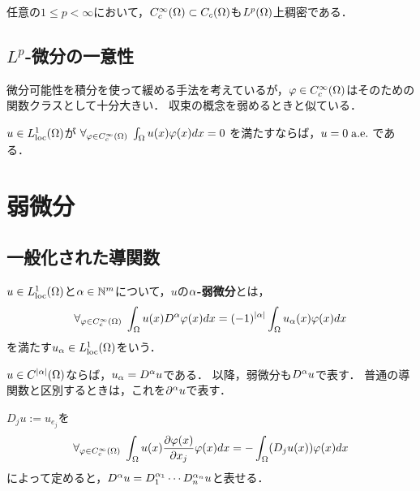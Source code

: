 \documentclass[uplatex,dvipdfmx]{jsreport}
\begin{document}
\begin{theorem}
    任意の$1\le p<\infty$において，$C_c^\infty(\Omega)\subset C_c(\Omega)$も$L^p(\Omega)$上稠密である．
\end{theorem}

\subsection{$L^p$-微分の一意性}

\begin{tcolorbox}[colframe=ForestGreen, colback=ForestGreen!10!white,breakable,colbacktitle=ForestGreen!40!white,coltitle=black,fonttitle=\bfseries\sffamily,
title=]
    微分可能性を積分を使って緩める手法を考えているが，$\varphi\in C_c^\infty(\Omega)$はそのための関数クラスとして十分大きい．
    収束の概念を弱めるときと似ている．
\end{tcolorbox}

\begin{theorem}\label{thm-uniqueness-of-weak-derivative}
    $u\in L^1_{\mathrm{loc}}(\Omega)$が
    $\forall_{\varphi\in C_c^\infty(\Omega)}\;\int_\Omega u(x)\varphi(x)dx=0$
    を満たすならば，$u=0\;\mathrm{a.e.}\;$である．
\end{theorem}

\section{弱微分}

\subsection{一般化された導関数}

\begin{definition}
    $u\in L^1_{\mathrm{loc}}(\Omega)$と$\alpha\in\mathbb{N}^m$について，$u$の\textbf{$\alpha$-弱微分}とは，
    \[\forall_{\varphi\in C_c^\infty(\Omega)}\;\int_\Omega u(x)D^\alpha\varphi(x)dx=(-1)^{\lvert\alpha\rvert}\int_\Omega u_\alpha(x)\varphi(x)dx\]
    を満たす$u_\alpha\in L^1_{\mathrm{loc}}(\Omega)$をいう．
\end{definition}
\begin{remark}
    $u\in C^{\lvert\alpha\rvert}(\Omega)$ならば，$u_\alpha=D^\alpha u$である．
    以降，弱微分も$D^\alpha u$で表す．
    普通の導関数と区別するときは，これを$\partial^\alpha u$で表す．
\end{remark}

\begin{notation}
    $D_ju:=u_{e_j}$を
    \[\forall_{\varphi\in C_c^\infty(\Omega)}\;\int_\Omega u(x)\frac{\partial \varphi(x)}{\partial x_j}\varphi(x)dx=-\int_\Omega (D_ju(x))\varphi(x)dx\]
    によって定めると，$D^{\alpha}u=D^{\alpha_1}_1\cdots D^{\alpha_n}_nu$と表せる．
\end{notation}
\end{document}

